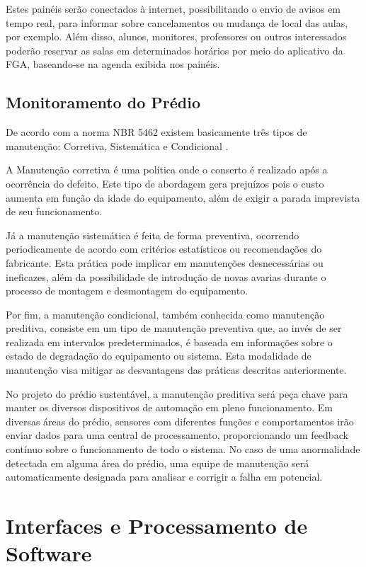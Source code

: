 Estes painéis serão conectados à internet, possibilitando o envio de avisos em tempo real, para informar sobre cancelamentos ou mudança de local das aulas, por exemplo. Além disso, alunos, monitores, professores ou outros interessados poderão reservar as salas em determinados horários por meio do aplicativo da FGA, baseando-se na agenda exibida nos painéis.

\section{Monitoramento do Prédio}
De acordo com a norma NBR 5462 existem basicamente três tipos de manutenção: Corretiva, Sistemática e Condicional \cite{souza2010}.

A Manutenção corretiva é uma política onde o conserto é realizado após a ocorrência do defeito. Este tipo de abordagem gera prejuízos pois o custo aumenta em função da idade do equipamento, além de exigir a parada imprevista de seu funcionamento.

Já a manutenção sistemática é feita de forma preventiva, ocorrendo periodicamente de acordo com critérios estatísticos ou recomendações do fabricante. Esta prática pode implicar em manutenções desnecessárias ou ineficazes, além da possibilidade de introdução de novas avarias durante o processo de montagem e desmontagem do equipamento.

Por fim, a manutenção condicional, também conhecida como manutenção preditiva, consiste em um tipo de manutenção preventiva que, ao invés de ser realizada em intervalos predeterminados, é baseada em informações sobre o estado de degradação do equipamento ou sistema. Esta modalidade de manutenção visa mitigar as desvantagens das práticas descritas anteriormente.

No projeto do prédio sustentável, a manutenção preditiva será peça chave para manter os diversos dispositivos de automação em pleno funcionamento. Em diversas áreas do prédio, sensores com diferentes funções e comportamentos irão enviar dados para uma central de processamento, proporcionando um feedback contínuo sobre o funcionamento de todo o sistema. No caso de uma anormalidade detectada em alguma área do prédio, uma equipe de manutenção será automaticamente designada para analisar e corrigir a falha em potencial.

\chapter[Interfaces e Processamento de Software]{Interfaces e Processamento de Software}

